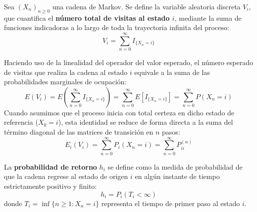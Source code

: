

\begin{definicion}
    Sea $(X_n)_{n \geq 0}$ una cadena de Markov. Se define la variable aleatoria discreta $V_i$, que cuantifica el \textbf{número total de visitas al estado $i$}, mediante la suma de funciones indicadoras a lo largo de toda la trayectoria infinita del proceso:
    \[
    V_i = \sum_{n=0}^{\infty} I_{\{X_n = i\}}
    \]
\end{definicion}

\begin{observacion}
    Haciendo uso de la linealidad del operador del valor esperado, el número esperado de visitas que realiza la cadena al estado $i$ equivale a la suma de las probabilidades marginales de ocupación:
    \[
    E(V_i) = E\left( \sum_{n=0}^{\infty} I_{\{X_n = i\}} \right) = \sum_{n=0}^{\infty} E\left[ I_{\{X_n = i\}} \right] = \sum_{n=0}^{\infty} P(X_n = i)
    \]
    Cuando asumimos que el proceso inicia con total certeza en dicho estado de referencia ($X_0 = i$), esta identidad se reduce de forma directa a la suma del término diagonal de las matrices de transición en $n$ pasos:
    \[
    E_i(V_i) = \sum_{n=0}^{\infty} P_i(X_n = i) = \sum_{n=0}^{\infty} P_{ii}^{(n)}
    \]
\end{observacion}


\begin{definicion}
    La \textbf{probabilidad de retorno} $h_i$ se define como la medida de probabilidad de que la cadena regrese al estado de origen $i$ en algún instante de tiempo estrictamente positivo y finito:
    \[
    h_i = P_i(T_i < \infty)
    \]
    donde $T_i = \inf\{n \geq 1 : X_n = i\}$ representa el tiempo de primer paso al estado $i$.
\end{definicion}

